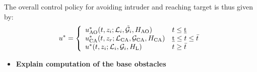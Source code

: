 




The overall control policy for avoiding intruder and reaching target is thus given by:
\begin{equation*}
u^* = 
\left \{ 
\begin{array}{ll}
u^*_\text{AO}(t, z_i; \mathcal{L}_i, \tilde{\mathcal{G}}_i, H_\text{AO}) & t \leq \underbar{t}\\
u^*_\text{CA}(t, z_r; \mathcal{L}_\text{CA}, \mathcal{G}_\text{CA}, H_\text{CA}) & \underbar{t} \leq t \leq \bar{t} \\
u^*(t, z_i; \mathcal{L}_i, \mathcal{G}_i, H_\text{L}) & t \geq \bar{t}
\end{array}
\right.
\end{equation*}

\begin{itemize}
\item \textbf{Explain computation of the base obstacles}
\end{itemize}